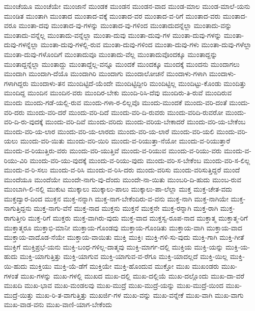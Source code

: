 {ಮುಂಚೆಯೂ
ಮುಂಚೆಯೇ
ಮುಂಜಾನೆ
ಮುಂಡಕ
ಮುಂಡನ
ಮುಂಡನ-ವಾದ
ಮುಂಡ-ಮಾಲ
ಮುಂಡ-ಮಾಲೆ-ಯನು
ಮುಂಡಿತ
ಮುಂತಾಗಿ
ಮುಂತಾದ
ಮುಂತಾದ-ವಕ್ಕೆ
ಮುಂತಾದ-ವರ
ಮುಂತಾದ-ವ-ರಿಗೆ
ಮುಂತಾದ-ವರು
ಮುಂತಾದ-ವರೂ
ಮುಂತಾ-ದವು
ಮುಂತಾದ-ವು-ಗಳನ್ನು
ಮುಂತಾದ-ವು-ಗಳಿಂದ
ಮುಂತಾದುದನ್ನೆಲ್ಲಾ
ಮುಂತಾದು-ವನ್ನು
ಮುಂತಾದು-ವನ್ನೆಲ್ಲ
ಮುಂತಾದು-ವನ್ನೆಲ್ಲಾ
ಮುಂತಾ-ದುವು
ಮುಂತಾ-ದುವು-ಗಳ
ಮುಂತಾ-ದುವು-ಗಳನ್ನು
ಮುಂತಾ-ದುವು-ಗಳನ್ನೆಲ್ಲಾ
ಮುಂತಾ-ದುವು-ಗಳಲ್ಲಿ-ರುವ
ಮುಂತಾ-ದುವು-ಗಳಿಂದ
ಮುಂತಾ-ದುವು-ಗಳು
ಮುಂತಾ-ದುವು-ಗಳೆಲ್ಲಾ
ಮುಂತಾ-ದುವು-ಗಳೊಂದಿಗೆ
ಮುಂತಾದುವೂ
ಮುಂತಾದು-ವೆಲ್ಲ
ಮುಂತಾದುವೊಂದಕ್ಕೂ
ಮುಂತಾದ್ದನ್ನು
ಮುಂತಾದ್ದನ್ನೆಲ್ಲಾ
ಮುಂತಾದ್ದು
ಮುಂತಾದ್ದೆಲ್ಲ-ವನ್ನೂ
ಮುಂದಕೆ
ಮುಂದಕ್ಕೂ
ಮುಂದಕ್ಕೆ
ಮುಂದನು
ಮುಂದಾಗಲು
ಮುಂದಾಗಿ
ಮುಂದಾಗಿ-ದೆಯೊ
ಮುಂದಾಗಿರಿ
ಮುಂದಾಗು
ಮುಂದಾಲೋಚನೆ
ಮುಂದಾಳು-ಗಳಾಗಿ
ಮುಂದಾಳು-ಗಳಾಗಿದ್ದರು
ಮುಂದಾಳು-ತನ
ಮುಂದಿಟ್ಟಿದೆ-ಯೆಂದೇ
ಮುಂದಿಟ್ಟಿದ್ದೀರಿ
ಮುಂದಿಟ್ಟಿಲ್ಲ
ಮುಂದಿಟ್ಟು-ಕೊಂಡು
ಮುಂದಿತ್ತು
ಮುಂದಿದ್ದ
ಮುಂದಿನ
ಮುಂದಿನ-ವರು
ಮುಂದಿರ-ಬೇಕು
ಮುಂದಿ-ರಿಸಿ-ದೆವು
ಮುಂದಿರು-ತಿ-ರುವೆ
ಮುಂದಿರುವ
ಮುಂದು
ಮುಂದು-ಗಡೆ-ಯಲ್ಲಿ-ರುವ
ಮುಂದು-ಗಳಾ-ರ-ಲಿಲ್ಲವೊ
ಮುಂದು-ಮುಂದಕೆ
ಮುಂದು-ವರಿ-ದಂತೆ
ಮುಂದು-ವರಿ-ದರು
ಮುಂದು-ವರಿ-ದರೆ
ಮುಂದು-ವರಿ-ದಿದೆ
ಮುಂದು-ವರಿ-ದಿ-ರುವರು
ಮುಂದು-ವರಿದಿ-ರುವರೋ
ಮುಂದು-ವರಿ-ದಿ-ರು-ವುದಕ್ಕೆ
ಮುಂದು-ವರಿ-ದಿವೆ
ಮುಂದು-ವರಿದು
ಮುಂದು-ವರಿಯ-ಬೇಕಾದರೆ
ಮುಂದು-ವರಿ-ಯ-ಬೇಕೆಂಬ
ಮುಂದು-ವರಿ-ಯ-ಲಾರ
ಮುಂದು-ವರಿ-ಯ-ಲಾರದು
ಮುಂದು-ವರಿ-ಯ-ಲಾರೆ
ಮುಂದು-ವರಿ-ಯಲಿ
ಮುಂದು-ವರಿ-ಯಲು
ಮುಂದು-ವರಿ-ಯಿತು
ಮುಂದು-ವರಿ-ಯಿರಿ
ಮುಂದು-ವ-ರಿಯುತ್ತಾ-ನೆಯೋ
ಮುಂದು-ವ-ರಿಯುತ್ತಾರೆ
ಮುಂದು-ವ-ರಿಯುತ್ತಿರು-ವರು
ಮುಂದು-ವರಿ-ಯುತ್ತಿವೆ
ಮುಂದು-ವ-ರಿಯುವ
ಮುಂದು-ವ-ರಿಯು-ವರು
ಮುಂದು-ವ-ರಿಯು-ವಿರಿ
ಮುಂದು-ವರಿ-ಯು-ವುದಕ್ಕೆ
ಮುಂದು-ವ-ರಿಯು-ವುದು
ಮುಂದು-ವರಿ-ಸ-ಬೇಕೆಂಬ
ಮುಂದು-ವರಿ-ಸ-ಲಿಲ್ಲ
ಮುಂದು-ವ-ರಿ-ಸಲು
ಮುಂದು-ವ-ರಿಸಿ
ಮುಂದು-ವ-ರಿಸಿ-ದರು
ಮುಂದು-ವರಿಸು
ಮುಂದು-ವರಿಸುತ್ತಿದ್ದರೆ
ಮುಂದೆ
ಮುಂದೆಯೂ
ಮುಂದೆಯೇ
ಮುಂದೇ-ನಾಗು-ವು-ದೆಂದು
ಮುಂದೇ-ನಾ-ಯಿತು
ಮುಂಬರಿ-ದಿ-ಹುದು
ಮುಂಬ-ರುವ
ಮುಂಬಾಗಿ-ಲಿ-ನಲ್ಲಿ
ಮುಕುಟ
ಮುಕ್ಕಾಲು
ಮುಕ್ಕಾಲು-ಪಾಲು
ಮುಕ್ಕಾಲು-ಪಾ-ಲೆಲ್ಲಾ
ಮುಕ್ತ
ಮುಕ್ತ-ಚೇತ-ವದು
ಮುಕ್ತದ್ವಾರ-ದಿಂದ
ಮುಕ್ತನ
ಮುಕ್ತ-ನನ್ನಾಗಿ
ಮುಕ್ತ-ನಾಗ-ಬೇಕೆಂದಿರು-ವ-ವನು
ಮುಕ್ತ-ನಾಗಿ
ಮುಕ್ತ-ನಾಗಿಯೇ
ಮುಕ್ತ-ನಾಗುತ್ತಿದ್ದನು
ಮುಕ್ತ-ನಾಗು-ವೆನೆ
ಮುಕ್ತ-ನಾದ
ಮುಕ್ತನು
ಮುಕ್ತನೆ
ಮುಕ್ತನೇ
ಮುಕ್ತ-ರನ್ನಾಗಿ
ಮುಕ್ತ-ರಾಗಿ
ಮುಕ್ತ-ರಾಗುತ್ತೀರಿ
ಮುಕ್ತ-ರಿಗೆ
ಮುಕ್ತರು
ಮುಕ್ತ-ವಾಗಿರು-ವುದು
ಮುಕ್ತ-ವಾದ
ಮುಕ್ತಸ್ವ-ರೂಪ-ನಾದ
ಮುಕ್ತಾತ್ಮ
ಮುಕ್ತಾತ್ಮ-ರಿಗೆ
ಮುಕ್ತಾತ್ಮರೂ
ಮುಕ್ತಾಭಿ-ಮಾನೀ
ಮುಕ್ತಾಯ-ಗೊಂಡವು
ಮುಕ್ತಾಯ-ಗೊಂಡಿತು
ಮುಕ್ತಾಯ-ವಾಗಿ
ಮುಕ್ತಾಯ-ವಾದ
ಮುಕ್ತಾಯ-ವಾದೊಡ-ನೆಯೇ
ಮುಕ್ತಾಯ-ವಾಯಿತು
ಮುಕ್ತಿ
ಮುಕ್ತಿಃ
ಮುಕ್ತಿ-ಗಳಿ-ಸು-ವುದು
ಮುಕ್ತಿ-ಗಾಗಿ
ಮುಕ್ತಿ-ಗೀತೆ
ಮುಕ್ತಿಗೆ
ಮುಕ್ತಿಪ್ರಭೆ-ಯನು
ಮುಕ್ತಿ-ಬಂಧ-ಗಳಿಲ್ಲ-ದಾತ್ಮವು
ಮುಕ್ತಿ-ಮಾರ್ಗ-ದಲ್ಲಿ
ಮುಕ್ತಿಯ
ಮುಕ್ತಿ-ಯನ್ನು
ಮುಕ್ತಿ-ಯ-ಹುದು
ಮುಕ್ತಿ-ಯಾಗುತ್ತಿತ್ತು
ಮುಕ್ತಿ-ಯಾಗುವ
ಮುಕ್ತಿ-ಯಾಗುವ-ವ-ರೆಗೂ
ಮುಕ್ತಿ-ಯಾದಲ್ಲದೆ
ಮುಕ್ತಿ-ಯಿಲ್ಲ
ಮುಕ್ತಿ-ಯಿ-ಹುದು
ಮುಕ್ತಿಯು
ಮುಕ್ತಿ-ಯೆ-ಡೆಗೆ
ಮುಕ್ತಿಯೇ
ಮುಕ್ತಿ-ಹೊಂದುವ
ಮುಕ್ತೋ
ಮುಖ
ಮುಖಂಡರು
ಮುಖ-ಗಳಂತೆ
ಮುಖ-ಗಳನ್ನು
ಮುಖ-ಗಳಲ್ಲಿ
ಮುಖದ
ಮುಖ-ದಲ್ಲಿ
ಮುಖ-ದಲ್ಲಿಯೆ
ಮುಖ-ದಲ್ಲೊಂದು
ಮುಖ-ದಾ-ವರೆ
ಮುಖದಿ
ಮುಖ-ಭಾವ
ಮುಖ-ಮಂಡಲವು
ಮುಖ-ಮುದ್ರೆ
ಮುಖ-ಮುದ್ರೆ-ಯನ್ನು
ಮುಖ-ಮುದ್ರೆ-ಯಿಂದ
ಮುಖ-ಮುದ್ರೆ-ಯಿತ್ತು
ಮುಖ-ರಿ-ತ-ವಾಗುತ್ತಿತ್ತು
ಮುಖರ್ಜಿ-ಗಳ
ಮುಖ-ವನ್ನು
ಮುಖ-ವನ್ನೇಕೆ
ಮುಖ-ವಾಗಿ
ಮುಖ-ವಾಗು
ಮುಖ-ವಾಡ-ವನು
ಮುಖ-ವಾಣಿ-ಯಾಗ-ಬೇಕೆಂದು
}
